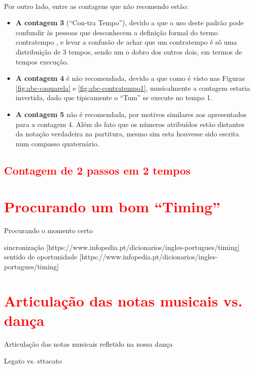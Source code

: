 ~\\

Por outro lado, entre as contagens que não recomendo estão:
\begin{itemize}
\item \textbf{A contagem 3} (``Con-tra Tempo''), 
devido a que o uso deste padrão pode confundir às pessoas que desconhecem 
a definição formal do termo contratempo \cite[pp. 16]{mascarenhascurso} \cite[pp. 36]{azevedocompor}, 
e levar a confusão de achar que um contratempo é só uma distribuição de 3 tempos, 
sendo um o dobro dos outros dois, em termos de tempos execução.
\item \textbf{A contagem 4} é não recomendada, devido a que como é visto nas Figuras 
\ref{fig:abc-caquarela} e \ref{fig:abc-contratempo1}, musicalmente a contagem estaria invertida,
dado que tipicamente o ``Tum'' se execute no tempo 1.

\item \textbf{A contagem 5} não é recomendada, 
por motivos similares aos apresentados para a contagem 4. 
Além do fato que os números atribuídos estão distantes da
notação verdadeira na partitura, mesmo sim esta houvesse sido escrita num compasso quaternário.
\end{itemize}

\subsection{\textcolor{red}{Contagem de 2 passos em 2 tempos}}


\section{\textcolor{red}{Procurando um bom ``Timing''}}
Procurando o momento certo

 sincronização [https://www.infopedia.pt/dicionarios/ingles-portugues/timing]
 sentido de oportunidade [https://www.infopedia.pt/dicionarios/ingles-portugues/timing]
\section{\textcolor{red}{Articulação das notas musicais vs. dança}}
Articulação das notas musicais refletido na nossa dança

Legato vs. sttacato


